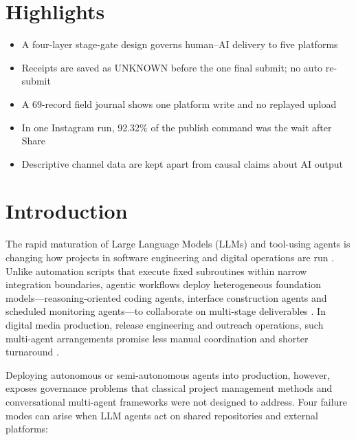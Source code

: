 \documentclass[11pt,a4paper]{article}
\theoremstyle{definition}
\begin{document}
\newpage
\section*{Highlights}
\begin{itemize}[leftmargin=1.5em]
    \item A four-layer stage-gate design governs human--AI delivery to five platforms
    \item Receipts are saved as UNKNOWN before the one final submit; no auto re-submit
    \item A 69-record field journal shows one platform write and no replayed upload
    \item In one Instagram run, 92.32\% of the publish command was the wait after Share
    \item Descriptive channel data are kept apart from causal claims about AI output
\end{itemize}

\newpage

\section{Introduction}
\label{sec:1}

The rapid maturation of Large Language Models (LLMs) and tool-using agents is changing how projects in software engineering and digital operations are run \citep{Holzmann2022, Muller2024, Wang2024Agent}. Unlike automation scripts that execute fixed subroutines within narrow integration boundaries, agentic workflows deploy heterogeneous foundation models---reasoning-oriented coding agents, interface construction agents and scheduled monitoring agents---to collaborate on multi-stage deliverables \citep{Wu2023AutoGen, Hong2023MetaGPT, Qian2024ChatDev}. In digital media production, release engineering and outreach operations, such multi-agent arrangements promise less manual coordination and shorter turnaround \citep{Raisch2021, Berente2021}.

Deploying autonomous or semi-autonomous agents into production, however, exposes governance problems that classical project management methods \citep{PMI2021, Kerzner2022} and conversational multi-agent frameworks were not designed to address. Four failure modes can arise when LLM agents act on shared repositories and external platforms:
\end{document}
